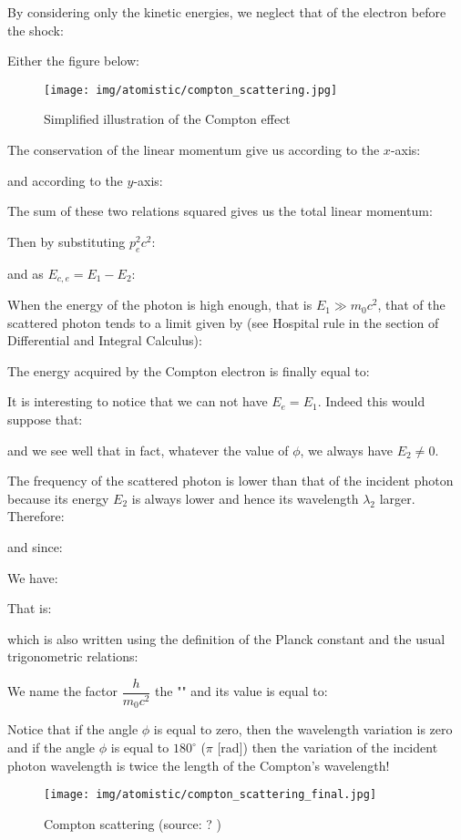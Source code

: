 	By considering only the kinetic energies, we neglect that of the electron before the shock:
	
	Either the figure below:
	\begin{figure}[H]
		\centering
		\texttt{[image: img/atomistic/compton\_scattering.jpg]}
		\caption[]{Simplified illustration of the Compton effect}
	\end{figure}
	The conservation of the linear momentum give us according to the $x$-axis:
	
	and according to the $y$-axis:
	
	The sum of these two relations squared gives us the total linear momentum:
	
	Then by substituting $p_e^2c^2$:
	
	and as $E_{c,e}=E_1-E_2$:
	
	When the energy of the photon is high enough, that is $E_1\gg m_0c^2$, that of the scattered photon tends to a limit given by (see Hospital rule in the section of Differential and Integral Calculus):
	
	The energy acquired by the Compton electron is finally equal to:
	
	It is interesting to notice that we can not have $E_e=E_1$. Indeed this would suppose that:
	
	and we see well that in fact, whatever the value of $\phi$, we always have $E_2\neq 0$.
	
	The frequency of the scattered photon is lower than that of the incident photon because its energy $E_2$ is always lower and hence its wavelength $\lambda_2$ larger. Therefore:
	
	and since:
	
	We have:
	
	That is:
	
	which is also written using the definition of the Planck constant and the usual trigonometric relations:
	
	We name the factor $\dfrac{h}{m_0c^2}$ the "\label{compton wavelength}" and its value is equal to:
	
	Notice that if the angle $\phi$ is equal to zero, then the wavelength variation is zero and if the angle $\phi$ is equal to $180^\circ$ ($\pi$ [rad]) then the variation of the incident photon wavelength is twice the length of the Compton's wavelength!
	
	\begin{figure}[H]
		\centering
		\texttt{[image: img/atomistic/compton\_scattering\_final.jpg]}
		\caption[Compton scattering]{Compton scattering (source: ? )}
	\end{figure}
	

